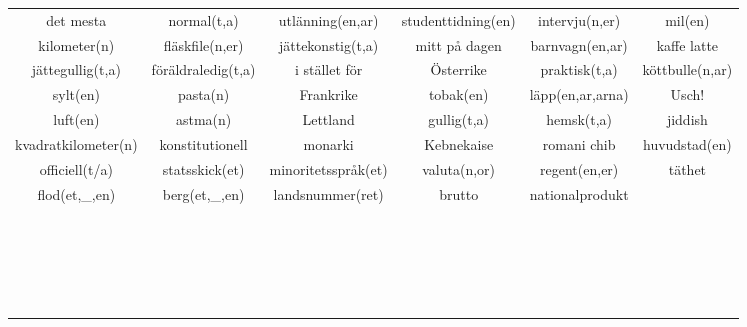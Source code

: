 \begin{center}
\begin{adjustwidth}{-2.7cm}{}
\begin{tabular}{|c c c c c c|}
            det mesta & normal(t,a) & utlänning(en,ar) & studenttidning(en) & intervju(n,er) & mil(en) \\
            kilometer(n) & fläskfile(n,er) & jättekonstig(t,a) & mitt på dagen & barnvagn(en,ar) & kaffe latte \\
            jättegullig(t,a) & föräldraledig(t,a) & i stället för & Österrike & praktisk(t,a) & köttbulle(n,ar) \\
            sylt(en) & pasta(n) & Frankrike & tobak(en) & läpp(en,ar,arna) & Usch! \\
            luft(en) & astma(n) & Lettland & gullig(t,a) & hemsk(t,a) & jiddish \\
            kvadratkilometer(n) & konstitutionell & monarki & Kebnekaise & romani chib & huvudstad(en) \\
            officiell(t/a) & statsskick(et) & minoritetsspråk(et) & valuta(n,or) & regent(en,er) & täthet \\
            flod(et,\_,en) & berg(et,\_,en) & landsnummer(ret) & brutto & nationalprodukt &  \\
             &  &  &  &  &  \\
             &  &  &  &  &  \\
             &  &  &  &  &  \\
             &  &  &  &  &  \\
             &  &  &  &  &  \\
             &  &  &  &  &  \\
             &  &  &  &  &  \\
             &  &  &  &  &  \\
             &  &  &  &  &  \\
             &  &  &  &  &  \\
             &  &  &  &  &  \\
             &  &  &  &  &  \\
             &  &  &  &  &  \\
             &  &  &  &  &  \\
             &  &  &  &  &  \\
             &  &  &  &  &  \\
             &  &  &  &  &  \\
             &  &  &  &  &  \\
             &  &  &  &  &  \\
             &  &  &  &  &  \\
             &  &  &  &  &  \\
            \hline
        \end{tabular}
    \end{adjustwidth}
\end{center}


